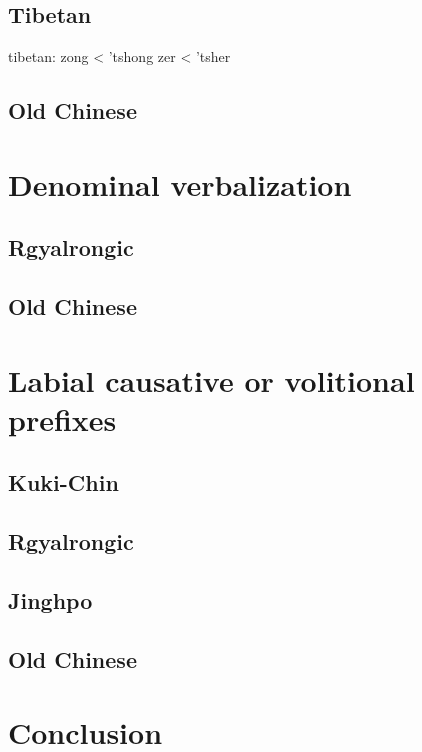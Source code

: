 \documentclass[oneside,a4paper,11pt]{article}
\begin{document}
\subsection{Tibetan}
tibetan:
zong < 'tshong
zer < 'tsher
\subsection{Old Chinese}
\section{Denominal verbalization}
\subsection{Rgyalrongic}
\subsection{Old Chinese}
\section{Labial causative or volitional prefixes}
\subsection{Kuki-Chin}
\subsection{Rgyalrongic}
\subsection{Jinghpo}
\subsection{Old Chinese}
\section*{Conclusion}



\end{document}
